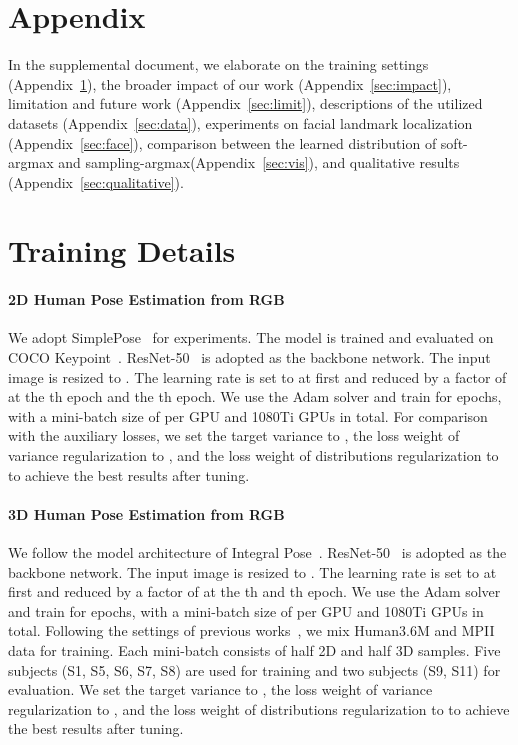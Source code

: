 \documentclass{article}
\begin{document}
\section*{Appendix}\label{sec:appendix}

In the supplemental document, we elaborate on the training settings (Appendix~\ref{sec:implement}), the broader impact of our work (Appendix~\ref{sec:impact}), limitation and future work (Appendix~\ref{sec:limit}), descriptions of the utilized datasets (Appendix~\ref{sec:data}), experiments on facial landmark localization (Appendix~\ref{sec:face}), comparison between the learned distribution of soft-argmax and sampling-argmax(Appendix~\ref{sec:vis}), and qualitative results (Appendix~\ref{sec:qualitative}).

\section{Training Details}\label{sec:implement}

\paragraph{2D Human Pose Estimation from RGB}
We adopt SimplePose~\cite{xiao2018simple} for experiments. The model is trained and evaluated on COCO Keypoint~\cite{mscoco}. ResNet-50~\cite{resnet} is adopted as the backbone network. The input image is resized to . The learning rate is set to  at first and reduced by a factor of  at the th epoch and the th epoch. We use the Adam solver and train for  epochs, with a mini-batch size of  per GPU and  1080Ti GPUs in total. For comparison with the auxiliary losses, we set the target variance  to , the loss weight of variance regularization to , and the loss weight of distributions regularization to  to achieve the best results after tuning.

\paragraph{3D Human Pose Estimation from RGB}
We follow the model architecture of Integral Pose~\cite{integral}. ResNet-50~\cite{resnet} is adopted as the backbone network. The input image is resized to . The learning rate is set to  at first and reduced by a factor of  at the th and th epoch. We use the Adam solver and train for  epochs, with a mini-batch size of  per GPU and  1080Ti GPUs in total. Following the settings of previous works~\cite{integral,moon}, we mix Human3.6M and MPII~\cite{mpii} data for training. Each mini-batch consists of half 2D and half 3D samples. Five subjects (S1, S5, S6, S7, S8) are used for training and two subjects (S9, S11) for evaluation. We set the target variance  to , the loss weight of variance regularization to , and the loss weight of distributions regularization to  to achieve the best results after tuning.
\end{document}
